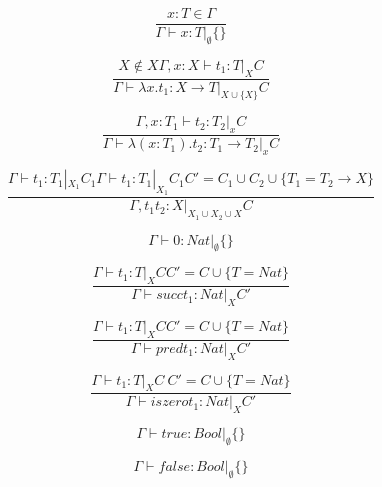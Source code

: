\documentclass{article}
\begin{document}

\begin{equation}
    \frac{x : T \in \Gamma}{\Gamma \vdash x : T |_{\emptyset} \{\}}
    \tag{CT-VAR}
\end{equation}

\begin{equation}
    \frac{X \notin X  \Gamma,x:X \vdash t_{1}:T |_{X} C}
    {\Gamma \vdash \lambda x.t_{1} : X \to T |_{X \cup \{X\}} C}
    \tag{CT-ABSINF}
\end{equation}

\begin{equation}
    \frac{\Gamma, x : T_{1} \vdash t_{2} : T_{2} |_{x} C}
    {\Gamma \vdash \lambda(x : T_{1}).t_{2} : T_{1} \to T_{2} |_{x} C}
    \tag{CT-ABS}
\end{equation}

\begin{equation}
    \frac{\Gamma \vdash t_{1} : T_{1} |_{X_{1}} C_{1} \Gamma \vdash t_{1} : T_{1} |_{X_{1}} C_{1} C' = C_{1} \cup C_{2} \cup \{ T_{1} = T_{2} \to X\}}
    {\Gamma, t_{1} t_{2} : X |_{X_{1} \cup X_{2} \cup X} C }
    \tag{CT-APP}
\end{equation}

\begin{equation}
    \Gamma \vdash 0 : Nat |_{\emptyset} \{\}
    \tag{CT-ZERO}
\end{equation}

\begin{equation}
    \frac{\Gamma \vdash t_{1} : T |_{X} C C' = C \cup \{T = Nat\}}
    {\Gamma \vdash succ t_{1} : Nat |_{X} C'}
    \tag{CT-SUCC}
\end{equation}

\begin{equation}
    \frac{\Gamma \vdash t_{1} : T |_{X} C C' = C \cup \{T = Nat\}}
    {\Gamma \vdash pred t_{1} : Nat |_{X} C'}
    \tag{CT-PRED}
\end{equation}

\begin{equation}
    \frac{\Gamma \vdash t_{1} : T |_{X} C \ C' = C \cup \{T = Nat\}}
    {\Gamma \vdash iszero t_{1} : Nat |_{X} C'}
    \tag{CT-ISZERO}
\end{equation}

\begin{equation}
    \Gamma \vdash true : Bool |_{\emptyset} \{\}
    \tag{CT-TRUE}
\end{equation}

\begin{equation}
    \Gamma \vdash false : Bool |_{\emptyset} \{\}
    \tag{CT-FALSE}
\end{equation}
\end{document}
